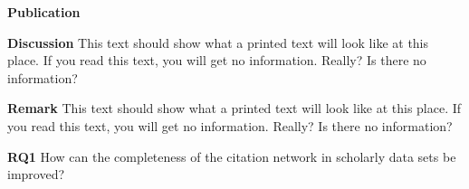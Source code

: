 






\begin{infobox-pub}
\textbf{Publication} 
\end{infobox-pub}

\begin{infobox-discussion}
\textbf{Discussion} This text should show what a printed text will look like at this place. If you read this text, you will get no information. Really? Is there no information?
\end{infobox-discussion}

\begin{infobox-info}
\textbf{Remark} This text should show what a printed text will look like at this place. If you read this text, you will get no information. Really? Is there no information?
\end{infobox-info}

\begin{infobox-q}
\textbf{RQ1} How can the completeness of the citation network in scholarly data sets be improved?
\end{infobox-q}

